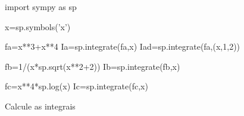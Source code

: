 \documentclass[a4paper,addpoints,12pt]{exam}
\newcommand{\dps}{\displaystyle}
\newcommand{\pyl}[1]{\py{sp.latex(#1)}}
\begin{document}
\begin{questions}


\begin{pycode}
import sympy as sp

x=sp.symbols('x')


fa=x**3+x**4
Ia=sp.integrate(fa,x)
Iad=sp.integrate(fa,(x,1,2))

fb=1/(x*sp.sqrt(x**2+2))
Ib=sp.integrate(fb,x)

fc=x**4*sp.log(x)
Ic=sp.integrate(fc,x)

\end{pycode}

\question Calcule as integrais

\begin{multicols}{2}

\end{multicols}

\begin{solution}
\begin{parts}
	\part 
\[\int_1^2 \pyl{fa}\,dx= \pyl{Ia}\Big\vert_{x=1}^{x=2}=\pyl{Iad}. \]


\end{parts}
\end{solution}
\end{questions}
\end{document}
